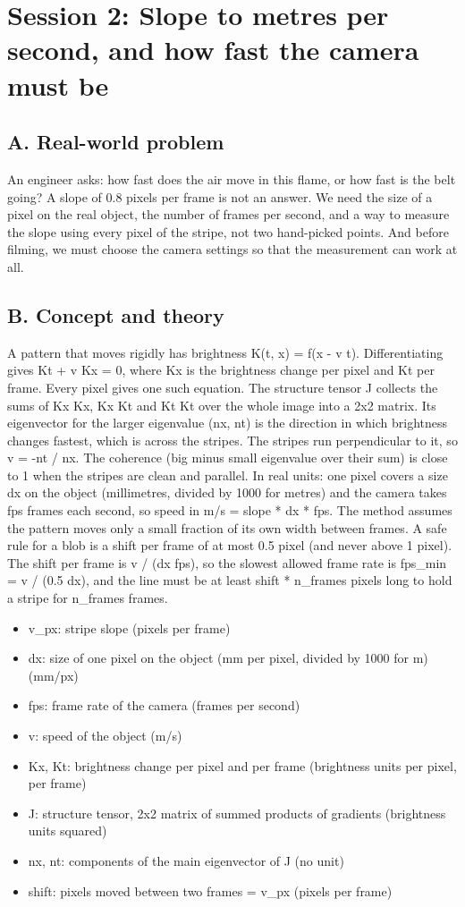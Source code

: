 \documentclass[11pt,a4paper]{article}
\begin{document}
\section{Session 2: Slope to metres per second, and how fast the camera must be}

\subsection*{A. Real-world problem}
An engineer asks: how fast does the air move in this flame, or how fast is the belt going? A slope of 0.8 pixels per frame is not an answer. We need the size of a pixel on the real object, the number of frames per second, and a way to measure the slope using every pixel of the stripe, not two hand-picked points. And before filming, we must choose the camera settings so that the measurement can work at all.

\subsection*{B. Concept and theory}
A pattern that moves rigidly has brightness K(t, x) = f(x - v t). Differentiating gives Kt + v Kx = 0, where Kx is the brightness change per pixel and Kt per frame. Every pixel gives one such equation. The structure tensor J collects the sums of Kx Kx, Kx Kt and Kt Kt over the whole image into a 2x2 matrix. Its eigenvector for the larger eigenvalue (nx, nt) is the direction in which brightness changes fastest, which is across the stripes. The stripes run perpendicular to it, so v = -nt / nx. The coherence (big minus small eigenvalue over their sum) is close to 1 when the stripes are clean and parallel. In real units: one pixel covers a size dx on the object (millimetres, divided by 1000 for metres) and the camera takes fps frames each second, so speed in m/s = slope * dx * fps. The method assumes the pattern moves only a small fraction of its own width between frames. A safe rule for a blob is a shift per frame of at most 0.5 pixel (and never above 1 pixel). The shift per frame is v / (dx fps), so the slowest allowed frame rate is fps\_min = v / (0.5 dx), and the line must be at least shift * n\_frames pixels long to hold a stripe for n\_frames frames.

\begin{itemize}[nosep]
\item v\_px: stripe slope (pixels per frame)
\item dx: size of one pixel on the object (mm per pixel, divided by 1000 for m) (mm/px)
\item fps: frame rate of the camera (frames per second)
\item v: speed of the object (m/s)
\item Kx, Kt: brightness change per pixel and per frame (brightness units per pixel, per frame)
\item J: structure tensor, 2x2 matrix of summed products of gradients (brightness units squared)
\item nx, nt: components of the main eigenvector of J (no unit)
\item shift: pixels moved between two frames = v\_px (pixels per frame)
\end{itemize}
\end{document}

